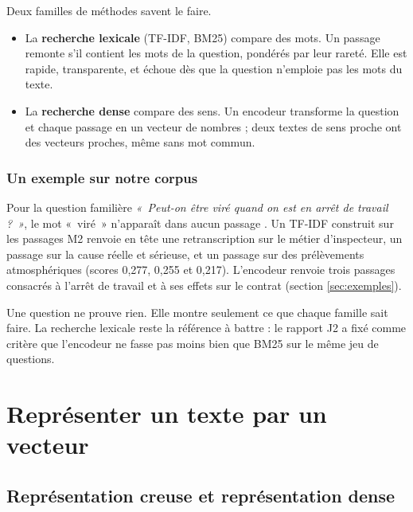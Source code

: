 Deux familles de méthodes savent le faire.

\begin{itemize}
\item La \textbf{recherche lexicale} (TF-IDF, BM25) compare des mots. Un passage remonte s'il contient les mots
  de la question, pondérés par leur rareté. Elle est rapide, transparente, et échoue dès que la question n'emploie
  pas les mots du texte.
\item La \textbf{recherche dense} compare des sens. Un encodeur transforme la question et chaque passage en un
  vecteur de nombres ; deux textes de sens proche ont des vecteurs proches, même sans mot commun.
\end{itemize}

\subsubsection{Un exemple sur notre corpus}

Pour la question familière \emph{«~Peut-on être viré quand on est en arrêt de travail ?~»}, le mot «~viré~»
n'apparaît dans aucun passage \mesure. Un TF-IDF construit sur les passages M2 renvoie en tête une retranscription
sur le métier d'inspecteur, un passage sur la cause réelle et sérieuse, et un passage sur des prélèvements
atmosphériques (scores 0,277, 0,255 et 0,217). L'encodeur renvoie trois passages consacrés à l'arrêt de travail et
à ses effets sur le contrat (section \ref{sec:exemples}).

Une question ne prouve rien. Elle montre seulement ce que chaque famille sait faire. La recherche lexicale reste la
référence à battre : le rapport J2 a fixé comme critère que l'encodeur ne fasse pas moins bien que BM25 sur le même
jeu de questions.

\section{Représenter un texte par un vecteur}

\subsection{Représentation creuse et représentation dense}

